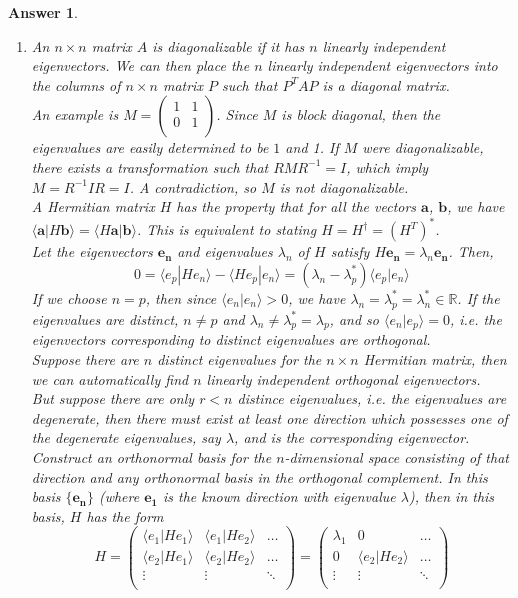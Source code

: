 \documentclass[a4paper]{article}
\newtheorem{ans}{Answer}[section]
\theoremstyle{new}
\begin{document}
\begin{ans}\leavevmode
\begin{enumerate}[label=(\alph*)]
\item An $n\times n$ matrix $A$ is diagonalizable if it has $n$ linearly independent eigenvectors. We can then place the $n$ linearly independent eigenvectors into the columns of $n\times n$ matrix $P$ such that $P^TAP$ is a diagonal matrix.\\[5pt]
An example is $M=\begin{pmatrix}1&1\\0&1\\\end{pmatrix}$. Since $M$ is block diagonal, then the eigenvalues are easily determined to be $1$ and 1. If $M$ were diagonalizable, there exists a transformation such that $RMR^{-1}=I$, which imply $M=R^{-1}IR=I$. A contradiction, so $M$ is not diagonalizable.\\[5pt]
A Hermitian matrix $H$ has the property that for all the vectors $\mathbf{a}$, $\mathbf{b}$, we have $\langle \mathbf{a}|H\mathbf{b}\rangle=\langle H\mathbf{a}|\mathbf{b}\rangle$. This is equivalent to stating $H=H^\dag=(H^T)^*$.\\[5pt]
Let the eigenvectors $\mathbf{e_n}$ and eigenvalues $\lambda_n$ of $H$ satisfy $H\mathbf{e_n}=\lambda_n\mathbf{e_n}$. Then,
$$0=\langle e_p|He_n\rangle-\langle He_p|e_n\rangle=(\lambda_n-\lambda_p^*)\langle e_p|e_n\rangle$$
If we choose $n=p$, then since $\langle e_n|e_n\rangle>0$, we have $\lambda_n=\lambda_p^*=\lambda_n^*\in\mathbb{R}$. If the eigenvalues are distinct, $n\neq p$ and $\lambda_n\neq\lambda_p^*=\lambda_p$, and so $\langle e_n|e_p\rangle=0$, i.e. the eigenvectors corresponding to distinct eigenvalues are orthogonal.\\[5pt]
Suppose there are $n$ distinct eigenvalues for the $n\times n$ Hermitian matrix, then we can automatically find $n$ linearly independent orthogonal eigenvectors.\\[5pt]
But suppose there are only $r<n$ distince eigenvalues, i.e. the eigenvalues are degenerate, then there must exist at least one direction which possesses one of the degenerate eigenvalues, say $\lambda$, and is the corresponding eigenvector. Construct an orthonormal basis for the $n$-dimensional space consisting of that direction and any orthonormal basis in the orthogonal complement. In this basis $\{\mathbf{e_n}\}$ (where $\mathbf{e_1}$ is the known direction with eigenvalue $\lambda$), then in this basis, $H$ has the form
$$H=\begin{pmatrix}\langle e_1|He_1\rangle&\langle e_1|He_2\rangle&\dots\\\langle e_2|He_1\rangle&\langle e_2|He_2\rangle&\dots\\\vdots&\vdots&\ddots\\\end{pmatrix}=\begin{pmatrix}\lambda_1&0&\dots\\0&\langle e_2|He_2\rangle&\dots\\\vdots&\vdots&\ddots\\\end{pmatrix}$$

\end{enumerate}
\end{ans}
\end{document}
